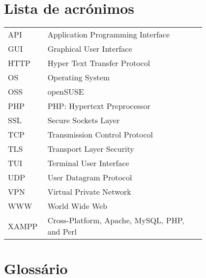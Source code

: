 \documentclass[11pt,a4paper]{report}
\begin{document}
\chapter*{Lista de acrónimos}

\begin{flushleft}
\begin{tabular}{l p{0.8\linewidth}}
    API     & Application Programming Interface\\
    GUI     & Graphical User Interface\\
    HTTP    & Hyper Text Transfer Protocol\\
    OS      & Operating System\\
    OSS     & openSUSE\\
    PHP     & PHP: Hypertext Preprocessor\\
    SSL     & Secure Sockets Layer\\
    TCP     & Transmission Control Protocol\\
    TLS     & Transport Layer Security\\
    TUI     & Terminal User Interface\\ %
    UDP     & User Datagram Protocol\\
    VPN     & Virtual Private Network\\
    WWW     & World Wide Web\\
    XAMPP   & Cross-Platform, Apache, MySQL, PHP, and Perl
\end{tabular}
\end{flushleft}

\chapter*{Glossário}
\end{document}
